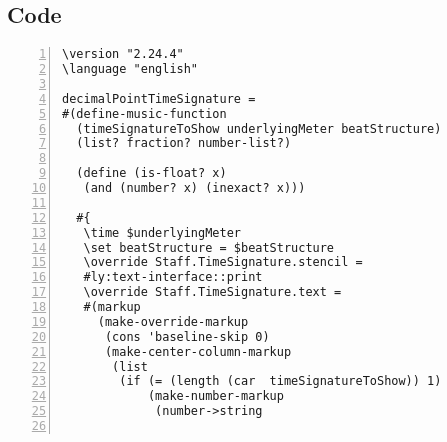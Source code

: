 \subsection{Code}
\begin{Verbatim}[numbers=left,xleftmargin=5mm]
\version "2.24.4"
\language "english"

decimalPointTimeSignature =
#(define-music-function
  (timeSignatureToShow underlyingMeter beatStructure)
  (list? fraction? number-list?)

  (define (is-float? x)
   (and (number? x) (inexact? x)))

  #{
   \time $underlyingMeter
   \set beatStructure = $beatStructure
   \override Staff.TimeSignature.stencil =
   #ly:text-interface::print
   \override Staff.TimeSignature.text =
   #(markup
     (make-override-markup
      (cons 'baseline-skip 0)
      (make-center-column-markup
       (list
        (if (= (length (car  timeSignatureToShow)) 1)
            (make-number-markup
             (number->string


\end{Verbatim}
